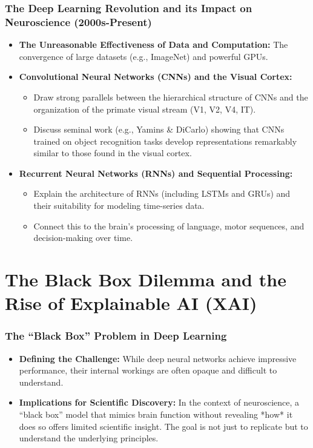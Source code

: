 \documentclass[11pt,a4paper]{article}
\begin{document}
\section{The Deep Learning Revolution and its Impact on Neuroscience (2000s-Present)}
\begin{itemize}
    \item \textbf{The Unreasonable Effectiveness of Data and Computation:} The convergence of large datasets (e.g., ImageNet) and powerful GPUs.
    \item \textbf{Convolutional Neural Networks (CNNs) and the Visual Cortex:}
        \begin{itemize}
            \item Draw strong parallels between the hierarchical structure of CNNs and the organization of the primate visual stream (V1, V2, V4, IT).
            \item Discuss seminal work (e.g., Yamins \& DiCarlo) showing that CNNs trained on object recognition tasks develop representations remarkably similar to those found in the visual cortex.
        \end{itemize}
    \item \textbf{Recurrent Neural Networks (RNNs) and Sequential Processing:}
        \begin{itemize}
            \item Explain the architecture of RNNs (including LSTMs and GRUs) and their suitability for modeling time-series data.
            \item Connect this to the brain's processing of language, motor sequences, and decision-making over time.
        \end{itemize}
\end{itemize}

\clearpage

\part{The Black Box Dilemma and the Rise of Explainable AI (XAI)}

\section{The ``Black Box'' Problem in Deep Learning}
\begin{itemize}
    \item \textbf{Defining the Challenge:} While deep neural networks achieve impressive performance, their internal workings are often opaque and difficult to understand.
    \item \textbf{Implications for Scientific Discovery:} In the context of neuroscience, a ``black box'' model that mimics brain function without revealing *how* it does so offers limited scientific insight. The goal is not just to replicate but to understand the underlying principles.
\end{itemize}
\end{document}
